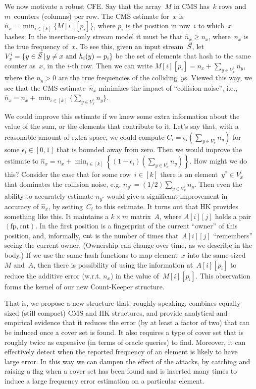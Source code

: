 We now motivate a robust CFE. Say that the array~$M$ in CMS has~$k$ rows and $m$~counters (columns) per row.
The CMS estimate for~$x$ is $\hat{n}_x=\min_{i \in [k]} \{M[i][p_i]\}$, where $p_i$ is the position in row~$i$ to which~$x$ hashes.  In the insertion-only stream model it must be that $\hat{n}_x \geq n_x$, where~$n_x$ is the true frequency of~$x$. To see this, given an input stream~$\vec{S}$,
let $V^{i}_{x}=\{y \in \vec{S} \,|\, y\neq x \mbox{ and } h_i(y)=p_i\}$ be the set of elements that hash to the same counter as~$x$, in the $i$-th row.  Then we can write $M[i][p_i]=n_x + \sum_{y \in V^i_x }n_y$, where the $n_y > 0$ are the true frequencies of the colliding~$y$s.
Viewed this way, we see that the CMS estimate~$\hat{n}_x$ minimizes the impact of ``collision noise'', i.e., 
$\hat{n}_x = n_x + \min_{i \in [k]}\{\sum_{y \in V^i_x }n_y\}$.  

We could improve this estimate if we knew some extra information about the value of the sum, or the elements that contribute to it. 
Let's say that, with a reasonable amount of extra space, we could compute $C_i = \epsilon_i \left(\sum_{y \in V^i_x }n_y\right)$ for some $\epsilon_i \in [0,1]$ that is bounded away from zero. Then we would improve the estimate to
$
\hat{n}_x = n_x + \min_{i \in [k]}\left\{(1-\epsilon_i)\left(\sum_{y \in V^i_x }n_y\right)\right\}
$.
How might we do this? Consider the case that for some row~$i \in [k]$ there is an element~$y^* \in V^{i}_{x}$ that dominates the collision noise, e.g. $n_{y^*} = (1/2)\sum_{y \in V^i_x }n_y$.  Then even the ability to accurately estimate $n_{y^*}$ would give a significant improvement in accuracy of $\hat{n}_x$, by setting~$C_i$ to this estimate. It turns out that HK provides something like this. It maintains a $k \times m$ matrix~$A$, where $A[i][j]$ holds a pair $(\mathrm{fp},\mathrm{cnt})$. In the first position is a fingerprint of the current ``owner'' of this position, and, informally, $\textup{cnt}$ is the number of times that~$A[i][j]$ ``remembers'' seeing the current owner.  (Ownership can change over time, as we describe in the body.) If we use the same hash functions to map element~$x$ into the same-sized~$M$ and~$A$, then there is possibility of using the information at~$A[i][p_i]$ to reduce the additive error (w.r.t. $n_x$) in the value of~$M[i][p_i]$.  This observation forms the kernel of our new Count-Keeper structure.

That is, we propose a new structure that, roughly speaking, combines equally sized (still compact) CMS and HK structures, and provide analytical and empirical evidence that it reduces the error (by at least a factor of two) that can be induced once a cover set is found. It also requires a type of cover set that is roughly twice as expensive (in terms of oracle queries) to find. Moreover, it can effectively detect when the reported frequency of an element is likely to have large error. In this way we can dampen the effect of the attacks, by catching and raising a flag when a cover set has been found and is inserted many times to induce a large frequency error estimation on a particular element.

